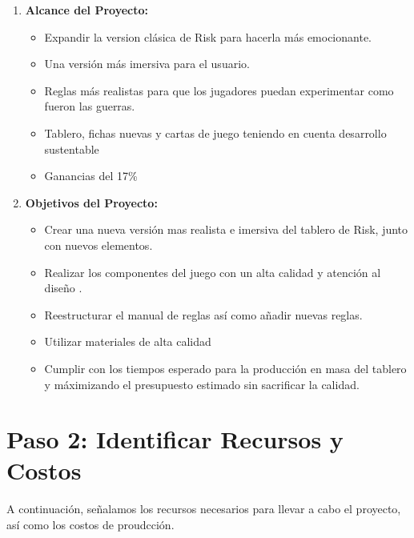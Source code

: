 \documentclass[12pt]{article}
\begin{document}
\begin{enumerate}
	\item \textbf{Alcance del Proyecto:} 

	\begin{itemize}
		\item Expandir la version clásica de Risk para hacerla más emocionante.

		\item Una versión más imersiva para el usuario.

		\item Reglas más realistas para que los jugadores puedan experimentar como fueron las guerras.
		\item Tablero, fichas nuevas y cartas de juego teniendo en cuenta desarrollo sustentable

		\item Ganancias del 17\%

	\end{itemize}

	\item \textbf{Objetivos del Proyecto:}

	\begin{itemize}
		\item Crear una nueva versión mas realista e imersiva del tablero de Risk, junto con nuevos elementos.

		\item Realizar los componentes del juego con un alta calidad y atención al diseño
		.
		\item Reestructurar el manual de reglas así como añadir nuevas reglas.

		\item Utilizar materiales de alta calidad

		\item Cumplir con los tiempos esperado para la producción en masa del tablero y máximizando el presupuesto estimado sin sacrificar la calidad.

	\end{itemize}

\end{enumerate}


 \section*{Paso 2: Identificar Recursos y Costos}


A continuación, señalamos los recursos necesarios para llevar a cabo el proyecto, así como los costos de proudcción.
\end{document}
